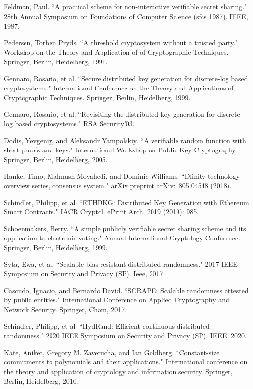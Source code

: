 \documentclass[11pt]{article}
\theoremstyle{definition}
\theoremstyle{remark}
\begin{document}
\newpage
\begin{thebibliography}{50}
Feldman, Paul. ``A practical scheme for non-interactive verifiable secret sharing." 28th Annual Symposium on Foundations of Computer Science (sfcs 1987). IEEE, 1987.

Pedersen, Torben Pryds. ``A threshold cryptosystem without a trusted party." Workshop on the Theory and Application of of Cryptographic Techniques. Springer, Berlin, Heidelberg, 1991.

Gennaro, Rosario, et al. ``Secure distributed key generation for discrete-log based cryptosystems." International Conference on the Theory and Applications of Cryptographic Techniques. Springer, Berlin, Heidelberg, 1999.

Gennaro, Rosario, et al. ``Revisiting the distributed key generation for discrete-log based cryptosystems." RSA Security'03.

Dodis, Yevgeniy, and Aleksandr Yampolskiy. ``A verifiable random function with short proofs and keys." International Workshop on Public Key Cryptography. Springer, Berlin, Heidelberg, 2005.

Hanke, Timo, Mahnush Movahedi, and Dominic Williams. ``Dfinity technology overview series, consensus system." arXiv preprint arXiv:1805.04548 (2018).

Schindler, Philipp, et al. ``ETHDKG: Distributed Key Generation with Ethereum Smart Contracts." IACR Cryptol. ePrint Arch. 2019 (2019): 985.

Schoenmakers, Berry. ``A simple publicly verifiable secret sharing scheme and its application to electronic voting." Annual International Cryptology Conference. Springer, Berlin, Heidelberg, 1999.

Syta, Ewa, et al. ``Scalable bias-resistant distributed randomness." 2017 IEEE Symposium on Security and Privacy (SP). Ieee, 2017.

Cascudo, Ignacio, and Bernardo David. ``SCRAPE: Scalable randomness attested by public entities." International Conference on Applied Cryptography and Network Security. Springer, Cham, 2017.

Schindler, Philipp, et al. ``HydRand: Efficient continuous distributed randomness." 2020 IEEE Symposium on Security and Privacy (SP). IEEE, 2020.

Kate, Aniket, Gregory M. Zaverucha, and Ian Goldberg. ``Constant-size commitments to polynomials and their applications." International conference on the theory and application of cryptology and information security. Springer, Berlin, Heidelberg, 2010.


\end{thebibliography}
\end{document}
